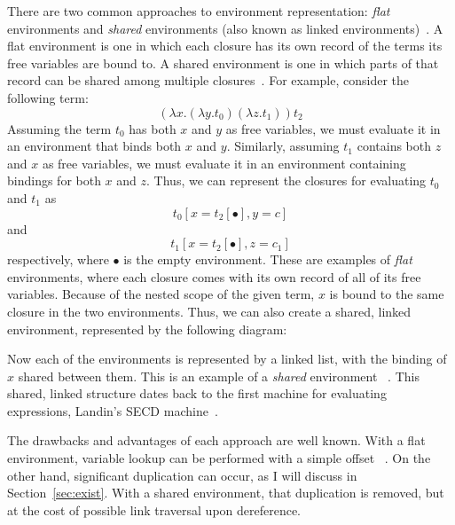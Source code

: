 There are two common approaches to environment representation: \emph{flat}
environments and \emph{shared} environments (also known as linked
environments)~\cite{appel1988optimizing,shao1994space}. A flat environment is
one in which each closure has its own record of the terms its free variables are
bound to. A shared environment is one in which parts of that record can be
shared among multiple closures~\cite{appel1988optimizing,shao1994space}. For
example, consider the following term: $$(\lambda x.(\lambda y.t_0) (\lambda
z.t_1)) t_2$$ Assuming the term $t_0$ has both $x$ and $y$ as free variables, we
must evaluate it in an environment that binds both $x$ and $y$.  Similarly,
assuming $t_1$ contains both $z$ and $x$ as free variables, we must evaluate it
in an environment containing bindings for both $x$ and $z$. Thus, we can
represent the closures for evaluating $t_0$ and $t_1$  as $$t_0[x=t_2[\bullet],
y=c]$$ and $$t_1[x=t_2[\bullet], z=c_1]$$ respectively, where $\bullet$ is the
empty environment.  These are examples of \emph{flat} environments, where each
closure comes with its own record of all of its free variables. Because of the
nested scope of the given term, $x$ is bound to the same closure in the two
environments. Thus, we can also create a shared, linked environment,
represented by the following diagram:

\begin{center}
\end{center}
Now each of the environments is represented by a linked list, with the binding
of $x$ shared between them. This is an example of a \emph{shared} environment
~\cite{appel1988optimizing}. This shared, linked structure dates back to the 
first machine for evaluating expressions, Landin's SECD
machine~\cite{landin1964mechanical}.

The drawbacks and advantages of each approach are well known. With a flat
environment, variable lookup can be performed with a simple offset
~\cite{jonesstg,appel1992compiling}. On the other hand, significant
duplication can occur, as I will discuss in Section~\ref{sec:exist}.
With a shared environment, that duplication is removed, but at the cost of
possible link traversal upon dereference. 

